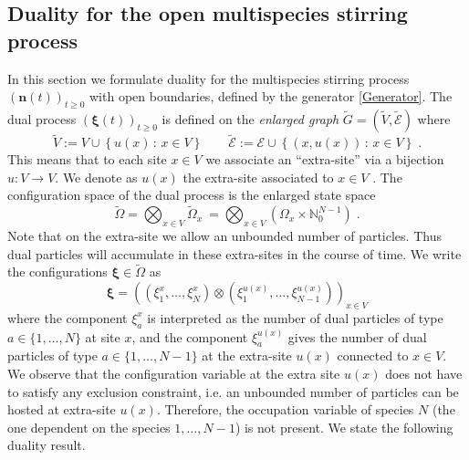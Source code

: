 \documentclass[10pt]{article}
\numberwithin{equation}{section}
\numberwithin{equation}{subsection}
\newcommand{\dt}{\;.}
\begin{document}
\subsection{Duality for the open multispecies stirring process}\label{statementDualitySubsection}
In this section we formulate duality for the multispecies stirring process $(\bm{n}(t))_{t\geq 0}$ with open boundaries, defined by the generator \eqref{Generator}.
The dual  process $(\bm{\xi}(t))_{t\geq 0}$ is defined on the \textit{enlarged graph} $\widetilde{G}=(\widetilde{V},\widetilde{\mathcal{E}})$ where 
\begin{equation}
	\widetilde{V}:=V\cup \left\{u(x)\,:\, x\in V\right\}\qquad \widetilde{\mathcal{E}}:=\mathcal{E}\cup \left\{(x,u(x))\,:\, x\in V\right\}\dt
\end{equation}
This means that to each site $x\in V$ we associate an ``extra-site'' via a bijection $u:V\to V$. We denote as $u(x)$ the extra-site associated to $x\in V$ . The configuration space of the dual process is the enlarged state space
\begin{equation}\label{dualStateSpace}
    \widetilde{\Omega}= \bigotimes_{x\in V} \widetilde{\Omega}_{x}\ = \bigotimes_{x\in V} (\Omega_{x}\times \mathbb{N}_{0}^{N-1})\dt
\end{equation}
Note that on the extra-site we allow an unbounded number of particles. Thus
dual particles will accumulate in these extra-sites in the course of time. 
We write the configurations $\bm{\xi} \in \widetilde\Omega$  as
\begin{equation}
    \bm{\xi}=\left(\left(\xi_{1}^{x},\ldots,\xi_{N}^{x}\right)\otimes (\xi_{1}^{u(x)},\ldots,\xi_{N-1}^{u(x)} )\right)_{x\in V}
\end{equation}
where the component $\xi_{a}^{x}$ is interpreted as the number of dual particles of type $a\in \{1,\ldots,N\}$ at site $x$, 
and the component $\xi_{a}^{u(x)}$  gives the number of dual particles of type $a\in \{1,\ldots,N-1\}$ at 
the extra-site $u(x)$ connected to $x\in V$. {\color{blue} We observe that the configuration variable at the extra site $u(x)$ does not have to satisfy any exclusion constraint, i.e. an unbounded number of particles can be hosted at extra-site $u(x)$. Therefore, the occupation variable of species $N$ (the one dependent on the species $1,\ldots,N-1$) is not present}. We state the following duality result.
\end{document}

